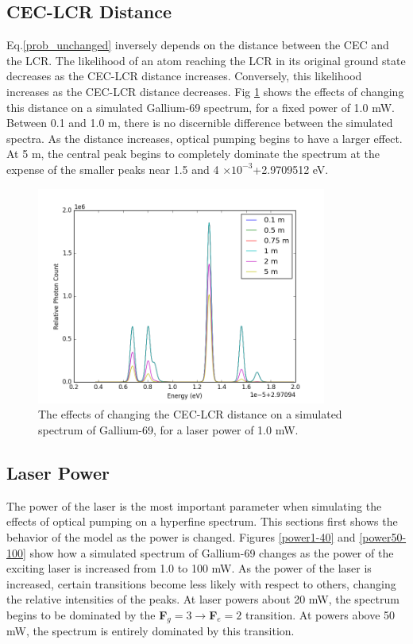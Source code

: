 \subsection{CEC-LCR Distance}
Eq.\ref{prob_unchanged} inversely depends on the distance between the CEC and the LCR. The likelihood of an atom reaching the LCR in its original ground state decreases as the CEC-LCR distance increases. Conversely, this likelihood increases as the CEC-LCR distance decreases. Fig \ref{CEC-LCR} shows the effects of changing this distance on a simulated Gallium-69 spectrum, for a fixed power of 1.0 mW. Between 0.1 and 1.0 m, there is no discernible difference between the simulated spectra. As the distance increases, optical pumping begins to have a larger effect. At 5 m, the central peak begins to completely dominate the spectrum at the expense of the smaller peaks near 1.5 and 4 $\times 10^{-3}$+2.9709512 eV.
\begin{figure}[h!]
\begin{center}
\includegraphics[width=0.85\textwidth]{Graphics/dist_comparison.png}
\end{center}
\caption[The effects of changing the CEC-LCR distance on a simulated spectrum of Gallium-69.]{\small The effects of changing the CEC-LCR distance on a simulated spectrum of Gallium-69, for a laser power of 1.0 mW.}
\label{CEC-LCR}
\end{figure}

\subsection{Laser Power}
The power of the laser is the most important parameter when simulating the effects of optical pumping on a hyperfine spectrum. This sections first shows the behavior of the model as the power is changed. Figures \ref{power1-40} and \ref{power50-100} show how a simulated spectrum of Gallium-69 changes as the power of the exciting laser is increased from 1.0 to 100 mW. As the power of the laser is increased, certain transitions become less likely with respect to others, changing the relative intensities of the peaks. At laser powers about 20 mW, the spectrum begins to be dominated by the \textbf{F}$_g = 3 \rightarrow$\textbf{F}$_e = 2$ transition. At powers above 50 mW, the spectrum is entirely dominated by this transition.


